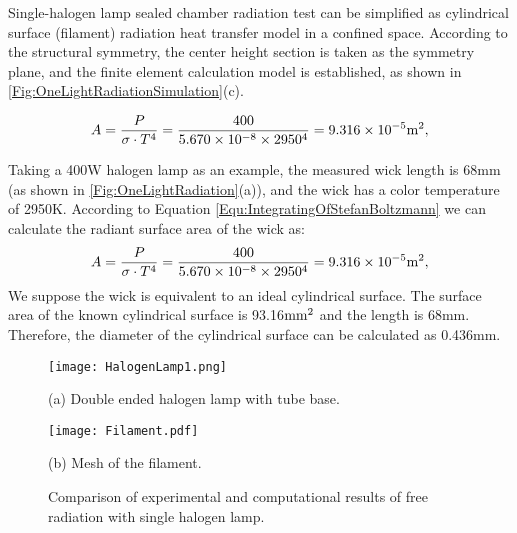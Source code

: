 Single-halogen lamp sealed chamber radiation test can be simplified as cylindrical surface (filament) radiation heat transfer model in a confined space.
According to the structural symmetry, the center height section is taken as the symmetry plane, and the finite element calculation model is established, as shown in \ref{Fig:OneLightRadiationSimulation}(c).

\begin{equation}
A = \frac{P}{\sigma \cdot T^4} = \frac{400}{5.670\times10^{-8}\times2950^4}=9.316\times10^{-5} {\rm{m}}^2,
\end{equation}

Taking a 400W halogen lamp as an example, the measured wick length is 68mm (as shown in \ref{Fig:OneLightRadiation}(a)), and the wick has a color temperature of 2950K. According to Equation \ref{Equ:IntegratingOfStefanBoltzmann} we can calculate the radiant surface area of the wick as:
\begin{equation}
A = \frac{P}{\sigma \cdot T^4} = \frac{400}{5.670\times10^{-8}\times2950^4}=9.316\times10^{-5} {\rm{m }}^2,
\end{equation}
We suppose the wick is equivalent to an ideal cylindrical surface. The surface area of the known cylindrical surface is 93.16${\rm{mm}}^2$ and the length is 68mm. Therefore, the diameter of the cylindrical surface can be calculated as 0.436mm.

\begin{figure}
  \begin{minipage}[t]{0.5\linewidth} %
  \nonumber
    \centering
    \texttt{[image: HalogenLamp1.png]}
    \centerline{(a) Double ended halogen lamp with tube base.}
    \label{Fig:HalogenLamp1}
  \end{minipage}%
  \begin{minipage}[t]{0.5\linewidth}
    \centering
    \texttt{[image: Filament.pdf]}
    \centerline{(b) Mesh of the filament.}
  \end{minipage}
  \caption{Comparison of experimental and computational results of free radiation with single halogen lamp.}
  \label{Fig:Filament}
\end{figure}

